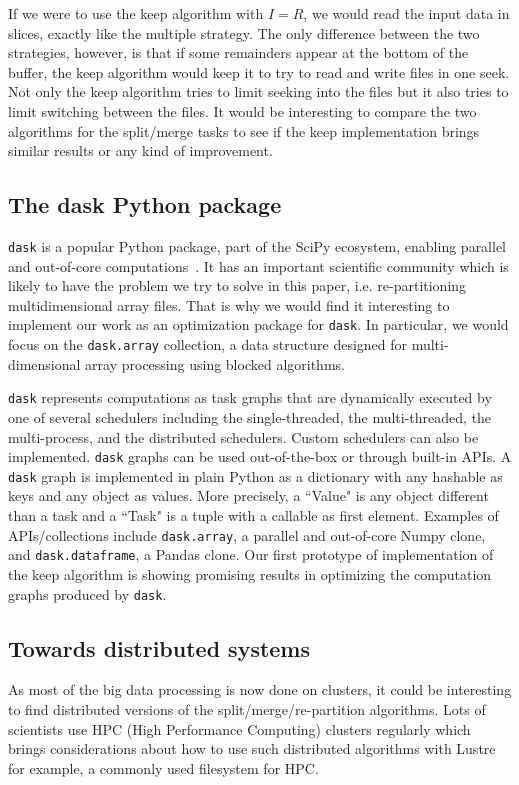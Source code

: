 \documentclass[sigconf, nonacm]{acmart}
\begin{document}
If we were to use the keep algorithm with $I=R$, we would read the input data
in slices, exactly like the multiple strategy. The only difference between the
two strategies, however, is that if some remainders appear at the bottom of the
buffer, the keep algorithm would keep it to try to read and write files in one
seek. Not only the keep algorithm tries to limit seeking into the files but it
also tries to limit switching between the files. It would be interesting to
compare the two algorithms for the split/merge tasks to see if the keep
implementation brings similar results or any kind of improvement.

\subsection{The dask Python package}
\texttt{dask} is a popular Python package, part of the SciPy ecosystem, enabling
parallel and out-of-core computations~\cite{matthew_rocklin-proc-scipy-2015}.
It has an important scientific community which is likely to have the problem we
try to solve in this paper, i.e. re-partitioning multidimensional array files.
That is why we would find it interesting to implement our work as an optimization
package for \texttt{dask}.
In particular, we would focus on the \texttt{dask.array} collection, a data
structure designed for multi-dimensional array processing using blocked
algorithms.

\texttt{dask} represents computations as task graphs that are dynamically executed by one
of several schedulers including the single-threaded, the multi-threaded, the
multi-process, and the distributed schedulers. Custom schedulers can also be
implemented. \texttt{dask} graphs can be used out-of-the-box or through
built-in APIs. A \texttt{dask} graph is implemented in plain Python as a
dictionary with any hashable as keys and any object as values. More precisely,
a ``Value" is any object different than a task and a ``Task" is a tuple with a
callable as first element. Examples of APIs/collections include
\texttt{dask.array}, a parallel and out-of-core
Numpy clone, and \texttt{dask.dataframe}, a Pandas clone.
Our first prototype of implementation of the keep algorithm is showing promising
results in optimizing the computation graphs produced by \texttt{dask}.

\subsection{Towards distributed systems}
As most of the big data processing is now done on clusters, it could be interesting
to find distributed versions of the split/merge/re-partition algorithms.
Lots of scientists use HPC (High Performance Computing) clusters regularly which
brings considerations about how to use such distributed algorithms with Lustre
for example, a commonly used filesystem for HPC.
\end{document}
